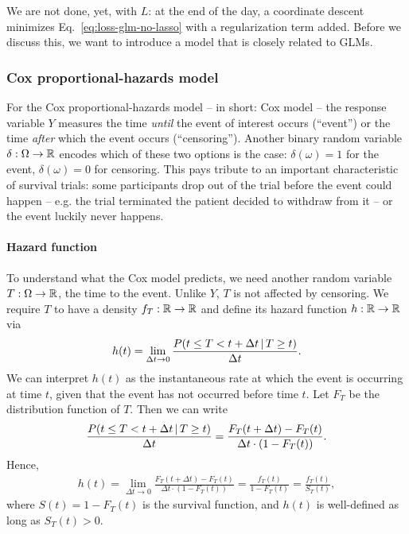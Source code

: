 We are not done, yet, with $L$: at the end of the day, a coordinate descent minimizes 
Eq.\ \eqref{eq:loss-glm-no-lasso} with a regularization term added. Before we discuss this, we want 
to introduce a model that is closely related to GLMs.

\subsubsection{Cox proportional-hazards model}\label{subsubsec:cox}

For the Cox proportional-hazards model -- in short: Cox model -- the response variable $Y$ 
measures the time \textit{until} the event of interest occurs (``event'') or the time 
\textit{after} which the event occurs (``censoring''). Another binary random variable 
$\delta: \Omega \to \mathbb{R}$ encodes 
which of these two options is the case: $\delta(\omega) = 1$ for the event, $\delta(\omega) = 0$ 
for censoring. This pays tribute to an important characteristic of survival trials: some
participants drop out of the trial before the event could happen -- e.g. the trial terminated the 
patient decided to withdraw from it -- or the event luckily never happens.

\paragraph{Hazard function} To understand what the Cox model predicts, we need another random 
variable $T: \Omega \to \mathbb{R}$, the time to the event. Unlike $Y$, $T$ is not affected by censoring. 
We require $T$ to have a density $f_T: \mathbb{R} \to \mathbb{R}$ and define its hazard function $h: \mathbb{R} \to \mathbb{R}$
via
\begin{align}
    h(t) = \lim_{\Delta t \to 0} \frac{P(t \leq T < t + \Delta t \,|\, T \geq t)}{\Delta t}.
\end{align}
We can interpret $h(t)$ as the instantaneous rate at which the event is occurring at time $t$, 
given that the event has not occurred before time $t$. Let $F_T$ be the distribution function of 
$T$. Then 
we can write
\begin{align}
    \frac{P(t \leq T < t + \Delta t \,|\, T \geq t)}{\Delta t} = 
    \frac{F_T(t + \Delta t) - F_T(t)}{\Delta t \cdot (1 - F_T(t))}.
\end{align}
Hence, 
\begin{align}
    h(t) = \lim_{\Delta t \to 0} \frac{F_T(t + \Delta t) - F_T(t)}{\Delta t \cdot (1 - F_T(t))} 
    = \frac{f_T(t)}{1 - F_T(t)} = \frac{f_T(t)}{S_T(t)},
\end{align}
where $S(t) = 1 - F_T(t)$ is the survival function, and $h(t)$ is well-defined as long as $S_T(t)
> 0$.

